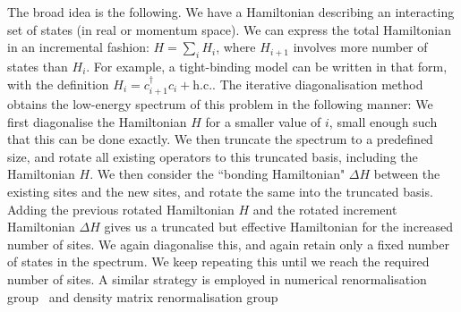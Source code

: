 The broad idea is the following. We have a Hamiltonian describing an interacting set of states (in real or momentum space). We can express the total Hamiltonian in an incremental fashion: \(H = \sum_i H_i\), where \(H_{i+1}\) involves more number of states than \(H_i\). For example, a tight-binding model can be written in that form, with the definition \(H_i = c^\dagger_{i+1}c_i + \text{h.c.}\). The iterative diagonalisation method obtains the low-energy spectrum of this problem in the following manner: We first diagonalise the Hamiltonian \(H\) for a smaller value of \(i\), small enough such that this can be done exactly. We then truncate the spectrum to a predefined size, and rotate all existing operators to this truncated basis, including the Hamiltonian \(H\). We then consider the ``bonding Hamiltonian" \(\Delta H\) between the existing sites and the new sites, and rotate the same into the truncated basis. Adding the previous rotated Hamiltonian \(H\) and the rotated increment Hamiltonian \(\Delta H\) gives us a truncated but effective Hamiltonian for the increased number of sites. We again diagonalise this, and again retain only a fixed number of states in the spectrum. We keep repeating this until we reach the required number of sites. A similar strategy is employed in numerical renormalisation group~\cite{wilson1975} and density matrix renormalisation group~\cite{white_1992,schollwock2005}

